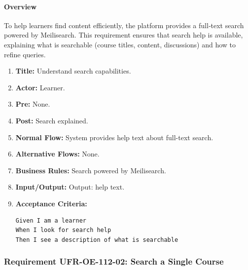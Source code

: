 \paragraph{Overview}
To help learners find content efficiently, the platform provides a full‑text search powered by Meilisearch. This requirement ensures that search help is available, explaining what is searchable (course titles, content, discussions) and how to refine queries.
\begin{enumerate}[label=\textbf{\arabic*.}]
\item \textbf{Title:} Understand search capabilities.
\item \textbf{Actor:} Learner.
\item \textbf{Pre:} None.
\item \textbf{Post:} Search explained.
\item \textbf{Normal Flow:} System provides help text about full-text search.
\item \textbf{Alternative Flows:} None.
\item \textbf{Business Rules:} Search powered by Meilisearch.
\item \textbf{Input/Output:} Output: help text.
\item \textbf{Acceptance Criteria:}
    \begin{verbatim}
Given I am a learner
When I look for search help
Then I see a description of what is searchable
    \end{verbatim}
\end{enumerate}

\subsubsection{Requirement UFR-OE-112-02: Search a Single Course}
